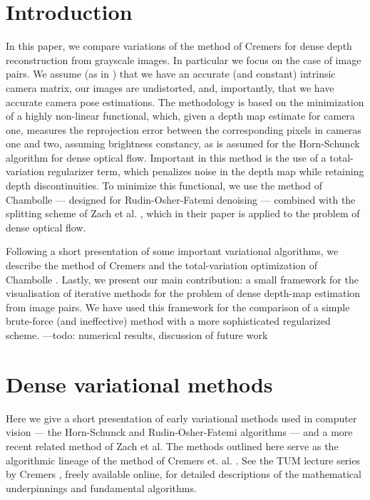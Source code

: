 \documentclass[conference]{IEEEtran}
\begin{document}
\section{Introduction}
In this paper, we compare variations of the method of Cremers \cite{dense_geometry} for dense
depth reconstruction from grayscale images. In particular we focus on the case of image pairs.
We assume (as in \cite{dense_geometry}) that we have an accurate (and constant) intrinsic camera matrix,
our images are undistorted, and, importantly, that we have accurate camera pose estimations.
The methodology is based on the minimization of a highly non-linear functional, which, given
a depth map estimate for camera one, measures the reprojection error between the corresponding
pixels in cameras one and two, assuming brightness constancy, as is assumed for the Horn-Schunck algorithm \cite{horn_schunck} for dense optical flow.
Important in this method is the use of a total-variation regularizer term, which penalizes noise in the depth map while retaining
depth discontinuities.
To minimize this functional, we use the method of Chambolle \cite{chambolle} --- designed for Rudin-Osher-Fatemi \cite{rof} denoising ---
combined with the splitting scheme of Zach et al. \cite{tv_optical_flow}, which in their paper is applied
to the problem of dense optical flow.

Following a short presentation of some important variational algorithms, we describe the method of Cremers
\cite{dense_geometry} and the total-variation optimization of Chambolle \cite{chambolle}.
Lastly, we present our main contribution: a small framework for the visualisation of iterative methods for the problem of
dense depth-map estimation from image pairs. We have used this framework for the comparison of a simple brute-force 
(and ineffective) method with a more sophisticated regularized scheme. ---todo: numerical results, discussion of future work

\section{Dense variational methods}
Here we give a short presentation of early variational methods used in computer vision ---
the Horn-Schunck and Rudin-Osher-Fatemi algorithms --- and a more recent related method of Zach et al. \cite{tv_optical_flow}
The methods outlined here serve as the algorithmic lineage of the method of Cremers et. al. \cite{dense_geometry}.
See the TUM lecture series by Cremers \cite{variational_lectures}, freely available online, for detailed descriptions of the mathematical underpinnings
and fundamental algorithms.
\end{document}

